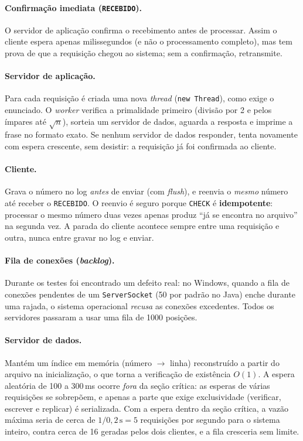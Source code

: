 \documentclass[11pt,a4paper]{article}
\newcommand{\msg}[1]{\texttt{#1}}
\newcommand{\classe}[1]{\texttt{#1}}
\begin{document}
\paragraph{Confirmação imediata (\msg{RECEBIDO}).}
O servidor de aplicação confirma o recebimento antes de processar. Assim o cliente
espera apenas milissegundos (e não o processamento completo), mas tem prova de que a
requisição chegou ao sistema; sem a confirmação, retransmite.

\paragraph{Servidor de aplicação.}
Para cada requisição é criada uma nova \emph{thread} (\texttt{new Thread}), como
exige o enunciado. O \emph{worker} verifica a primalidade primeiro (divisão por 2 e
pelos ímpares até $\sqrt{n}$), sorteia um servidor de dados, aguarda a resposta e
imprime a frase no formato exato. Se nenhum servidor de dados responder, tenta
novamente com espera crescente, sem desistir: a requisição já foi confirmada ao
cliente.

\paragraph{Cliente.}
Grava o número no log \emph{antes} de enviar (com \emph{flush}), e reenvia o
\emph{mesmo} número até receber o \msg{RECEBIDO}. O reenvio é seguro porque
\msg{CHECK} é \textbf{idempotente}: processar o mesmo número duas vezes apenas produz
``já se encontra no arquivo'' na segunda vez. A parada do cliente acontece sempre
entre uma requisição e outra, nunca entre gravar no log e enviar.

\paragraph{Fila de conexões (\emph{backlog}).}
Durante os testes foi encontrado um defeito real: no Windows, quando a fila de
conexões pendentes de um \classe{ServerSocket} (50 por padrão no Java) enche durante
uma rajada, o sistema operacional \emph{recusa} as conexões excedentes. Todos os
servidores passaram a usar uma fila de 1000 posições.

\paragraph{Servidor de dados.}
Mantém um índice em memória (número $\rightarrow$ linha) reconstruído a partir do
arquivo na inicialização, o que torna a verificação de existência $O(1)$. A espera
aleatória de 100 a 300\,ms ocorre \emph{fora} da seção crítica: as esperas de
várias requisições se sobrepõem, e apenas a parte que exige exclusividade
(verificar, escrever e replicar) é serializada. Com a espera dentro da seção crítica,
a vazão máxima seria de cerca de $1/0{,}2\,\text{s} = 5$ requisições por segundo
para o sistema inteiro, contra cerca de 16 geradas pelos dois clientes, e a fila
cresceria sem limite.
\end{document}
